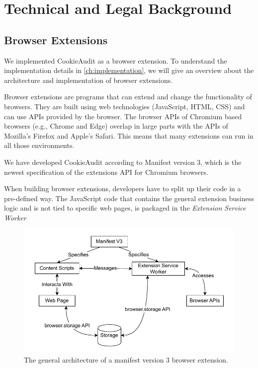 \chapter{Technical and Legal Background}

\section{Browser Extensions}
We implemented CookieAudit as a browser extension.
To understand the implementation details in \cref{ch:implementation}, we will give an overview about the architecture and implementation of browser extensions.

Browser extensions are programs that can extend and change the functionality of browsers.
They are built using web technologies (JavaScript, HTML, CSS) and can use APIs provided by the browser.
The browser APIs of Chromium based browsers (e.g., Chrome and Edge) overlap in large parts with the APIs of Mozilla's Firefox and Apple's Safari.
This means that many extensions can run in all those environments.

We have developed CookieAudit according to Manifest version 3, which is the newest specification of the extensions API for Chromium browsers.

When building browser extensions, developers have to split up their code in a pre-defined way.
The JavaScript code that contains the general extension business logic and is not tied to specific web pages, is packaged in the \emph{Extension Service Worker}


\begin{figure}
	\centering
	\includegraphics[width=\textwidth]{media/browser-extension-architecture.drawio.pdf}
    \caption{The general architecture of a manifest version 3 browser extension.}
    \label{fig:extension-architecture}
\end{figure}